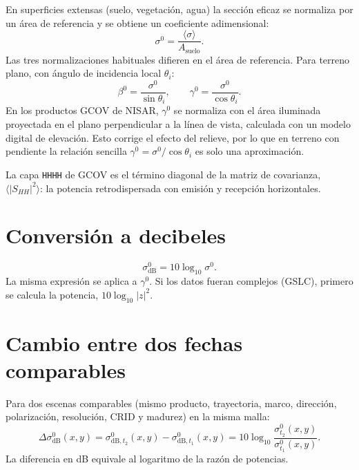 \documentclass[11pt,a4paper]{article}
\begin{document}
En superficies extensas (suelo, vegetación, agua) la sección eficaz se normaliza por un área de
referencia y se obtiene un coeficiente adimensional:
\begin{equation}
  \sigma^0 = \frac{\langle \sigma \rangle}{A_{\text{suelo}}} .
\end{equation}
Las tres normalizaciones habituales difieren en el área de referencia. Para terreno plano, con
ángulo de incidencia local $\theta_i$:
\begin{equation}
  \beta^0 = \frac{\sigma^0}{\sin\theta_i},
  \qquad
  \gamma^0 = \frac{\sigma^0}{\cos\theta_i}.
\end{equation}
En los productos GCOV de NISAR, $\gamma^0$ se normaliza con el área iluminada proyectada en el
plano perpendicular a la línea de vista, calculada con un modelo digital de elevación. Esto
corrige el efecto del relieve, por lo que en terreno con pendiente la relación sencilla
$\gamma^0 = \sigma^0/\cos\theta_i$ es solo una aproximación.

La capa \texttt{HHHH} de GCOV es el término diagonal de la matriz de covarianza,
$\langle |S_{HH}|^2 \rangle$: la potencia retrodispersada con emisión y recepción horizontales.

\section{Conversión a decibeles}

\begin{equation}
  \sigma^0_{\text{dB}} = 10 \log_{10} \sigma^0 .
  \label{eq:db}
\end{equation}
La misma expresión se aplica a $\gamma^0$. Si los datos fueran complejos (GSLC), primero se
calcula la potencia, $10\log_{10}|z|^2$.

\section{Cambio entre dos fechas comparables}

Para dos escenas comparables (mismo producto, trayectoria, marco, dirección, polarización,
resolución, CRID y madurez) en la misma malla:
\begin{equation}
  \Delta\sigma^0_{\text{dB}}(x,y) = \sigma^0_{\text{dB},t_2}(x,y) - \sigma^0_{\text{dB},t_1}(x,y)
  = 10\log_{10}\frac{\sigma^0_{t_2}(x,y)}{\sigma^0_{t_1}(x,y)} .
  \label{eq:delta}
\end{equation}
La diferencia en dB equivale al logaritmo de la razón de potencias.
\end{document}
